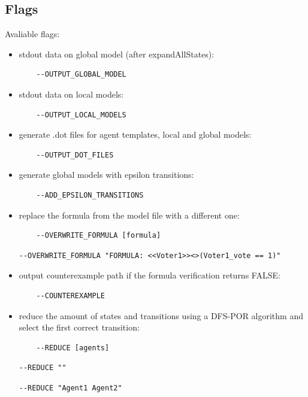 \documentclass[12pt]{article}
\begin{document}
\subsection{Flags}
Avaliable flags:
\begin{itemize}
  \item stdout data on global model (after expandAllStates):
  \begin{lstlisting}
    --OUTPUT_GLOBAL_MODEL
  \end{lstlisting}
  \item stdout data on local models:
  \begin{lstlisting}
    --OUTPUT_LOCAL_MODELS
  \end{lstlisting}
  \item generate .dot files for agent templates, local and global models:
  \begin{lstlisting}
    --OUTPUT_DOT_FILES 
  \end{lstlisting}
  \item generate global models with epsilon transitions:
  \begin{lstlisting}
    --ADD_EPSILON_TRANSITIONS
  \end{lstlisting}
  \item replace the formula from the model file with a different one:
  \begin{lstlisting}
    --OVERWRITE_FORMULA [formula]
  \end{lstlisting}
  \begin{lstlisting}[title={Example formula replacement with another one.}]
    --OVERWRITE_FORMULA "FORMULA: <<Voter1>><>(Voter1_vote == 1)"
  \end{lstlisting}
  \item output counterexample path if the formula verification returns FALSE:
  \begin{lstlisting}
    --COUNTEREXAMPLE
  \end{lstlisting}
  \item reduce the amount of states and transitions using a DFS-POR algorithm and select the first correct transition:
  \begin{lstlisting}
    --REDUCE [agents]
  \end{lstlisting}
  \begin{lstlisting}[title={Example reduction with no specified agent.}]
    --REDUCE ""
  \end{lstlisting}
  \begin{lstlisting}[title={Example reduction with 2 specified agents.}]
    --REDUCE "Agent1 Agent2"

\end{lstlisting}
\end{itemize}
\end{document}
